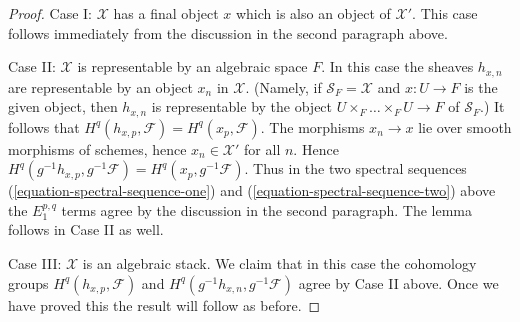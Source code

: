\begin{proof}
\medskip\noindent
Case I: $\mathcal{X}$ has a final object $x$ which is also an object of
$\mathcal{X}'$. This case follows immediately from the discussion
in the second paragraph above.

\medskip\noindent
Case II: $\mathcal{X}$ is representable by an algebraic space $F$.
In this case the sheaves $h_{x, n}$ are representable by an
object $x_n$ in $\mathcal{X}$. (Namely, if $\mathcal{S}_F = \mathcal{X}$
and $x : U \to F$ is the given object, then $h_{x, n}$ is representable
by the object $U \times_F \ldots \times_F U \to F$ of $\mathcal{S}_F$.)
It follows that $H^q(h_{x, p}, \mathcal{F}) = H^q(x_p, \mathcal{F})$.
The morphisms $x_n \to x$ lie over smooth morphisms of schemes, hence
$x_n \in \mathcal{X}'$ for all $n$. Hence
$H^q(g^{-1}h_{x, p}, g^{-1}\mathcal{F}) = H^q(x_p, g^{-1}\mathcal{F})$.
Thus in the two spectral sequences
(\ref{equation-spectral-sequence-one}) and
(\ref{equation-spectral-sequence-two}) above the $E_1^{p, q}$ terms agree
by the discussion in the second paragraph. The lemma follows in Case II
as well.

\medskip\noindent
Case III: $\mathcal{X}$ is an algebraic stack. We claim that in this case
the cohomology groups $H^q(h_{x, p}, \mathcal{F})$ and
$H^q(g^{-1}h_{x, n}, g^{-1}\mathcal{F})$ agree by Case II above.
Once we have proved this the result will follow as before.


\end{proof}
